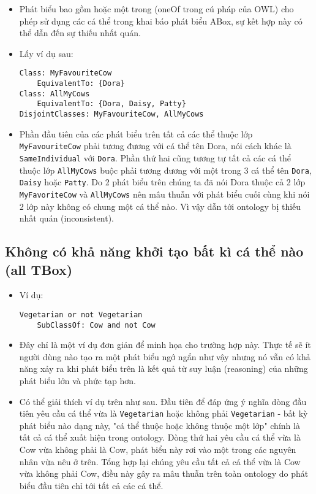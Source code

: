 \begin{itemize}
\item 
Phát biểu bao gồm hoặc một trong (oneOf trong cú pháp của OWL) cho phép sử dụng các cá thể trong khai báo phát biểu ABox, sự kết hợp này có thể dẫn đến sự thiếu nhất quán.
\item
Lấy ví dụ sau:
\begin{verbatim}
Class: MyFavouriteCow
  	EquivalentTo: {Dora}
Class: AllMyCows
  	EquivalentTo: {Dora, Daisy, Patty}
DisjointClasses: MyFavouriteCow, AllMyCows
\end{verbatim}
\item
Phần đầu tiên của các phát biểu trên tất cả các thể thuộc lớp \texttt{MyFavouriteCow} phải tương đương với cá thể tên Dora, nói cách khác là \texttt{SameIndividual} với \texttt{Dora}. Phần thứ hai cũng  tương tự tất cả các cá thể thuộc lớp \texttt{AllMyCows} buộc phải tương đương với một trong 3 cá thể tên \texttt{Dora}, \texttt{Daisy} hoặc \texttt{Patty}. Do 2 phát biểu trên chúng ta đã nói Dora thuộc cả 2 lớp \texttt{MyFavoriteCow} và \texttt{AllMyCows} nên mâu thuẫn với phát biểu cuối cùng khi nói 2 lớp này không có chung một cá thể nào. Vì vậy dẫn tới ontology bị thiếu nhất quán (inconsistent).
\end{itemize}
\subsection{Không có khả năng khởi tạo bất kì cá thể nào (all TBox)}
\begin{itemize}
\item Ví dụ:
\begin{verbatim}
Vegetarian or not Vegetarian
	SubClassOf: Cow and not Cow
\end{verbatim}
\item
Đây chỉ là một ví dụ đơn giản để minh họa cho trường hợp này. Thực tế sẽ ít người dùng nào tạo ra một phát biểu ngớ ngẩn như vậy nhưng nó vẫn có khả năng xảy ra khi phát biểu trên là kết quả từ suy luận (reasoning) của những phát biểu lớn và phức tạp hơn.
\item
Có thể giải thích ví dụ trên như sau. Đầu tiên để đáp ứng ý nghĩa dòng đầu tiên yêu cầu cá thể vừa là \texttt{Vegetarian} hoặc không phải \texttt{Vegetarian} - bất kỳ phát biểu nào dạng này, "cá thể thuộc hoặc không thuộc một lớp" chính là tất cả cá thể xuất hiện trong ontology. Dòng thứ hai yêu cầu cá thể vừa là Cow vừa không phải là Cow, phát biểu này rơi vào một trong các nguyên nhân vừa nêu ở trên. Tổng hợp lại chúng yêu cầu tất cả cá thể vừa là Cow vừa không phải Cow, điều này gây ra mâu thuẫn trên toàn ontology do phát biểu đầu tiên chỉ tới tất cả các cá thể.
\end{itemize}

